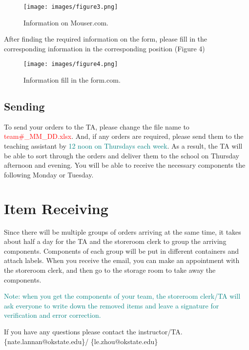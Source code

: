 \documentclass[10pt,oneside,fleqn]{article}
\begin{document}
\begin{figure}[H]
    \centering
    \texttt{[image: images/figure3.png]}
    \caption{Information on Mouser.com.}
\end{figure} \vspace{-5mm}
After finding the required information on the form, please fill in the corresponding information in the corresponding position (Figure 4)
\begin{figure}[H]
    \centering
    \texttt{[image: images/figure4.png]}
    \caption{Information fill in the form.com.}
\end{figure} \vspace{-5mm}
\subsection{Sending}
To send your orders to the TA, please change the file name to \textcolor{red}{team\#\_MM\_DD.xlsx}. And, if any orders are required, please send them to the teaching assistant by \textcolor{teal}{12 noon on Thursdays each week}. As a result, the TA will be able to sort through the orders and deliver them to the school on Thursday afternoon and evening. You will be able to receive the necessary components the following Monday or Tuesday.
\section{Item Receiving}
Since there will be multiple groups of orders arriving at the same time, it takes about half a day for the TA and the storeroom clerk to group the arriving components. Components of each group will be put in different containers and attach labels. When you receive the email, you can make an appointment with the storeroom clerk, and then go to the storage room to take away the components.

\textcolor{teal}{Note: when you get the components of your team, the storeroom clerk/TA will ask everyone to write down the removed items and leave a signature for verification and error correction.}

If you have any questions please contact the instructor/TA. \{nate.lannan@okstate.edu\}/ \{le.zhou@okstate.edu\}
	
\end{document}
